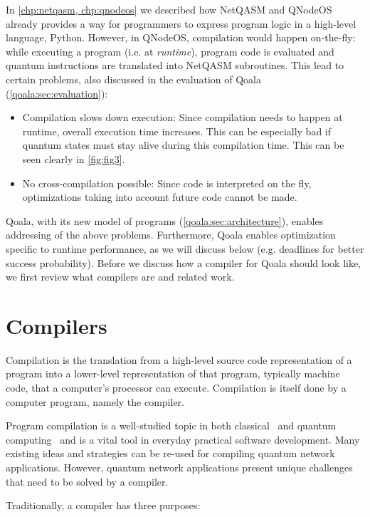 In \cref{chp:netqasm, chp:qnodeos} we described how NetQASM and QNodeOS already provides a way for programmers to express program logic in a high-level language, Python.
However, in \ac{QNodeOS}, compilation would happen on-the-fly:
while executing a program (i.e. at \emph{runtime}), program code is evaluated and quantum instructions are translated into NetQASM subroutines.
This lead to certain problems, also discussed in the evaluation of Qoala (\cref{qoala:sec:evaluation}):
\begin{itemize}
  \item Compilation slows down execution:
    Since compilation needs to happen at runtime, overall execution time increases.
    This can be especially bad if quantum states must stay alive during this compilation time.
    This can be seen clearly in \cref{fig:fig3}.
  \item No cross-compilation possible:
    Since code is interpreted on the fly, optimizations taking into account future code cannot be made. 
\end{itemize}

Qoala, with its new model of programs (\cref{qoala:sec:architecture}), enables addressing of the above problems.
Furthermore, Qoala enables optimization specific to runtime performance, as we will discuss below (e.g. deadlines for better success probability).
Before we discuss how a compiler for Qoala should look like, we first review what compilers are and related work.


\section{Compilers}
Compilation is the translation from a high-level source code representation of a program into a lower-level representation of that program, typically machine code, that a computer's processor can execute.
Compilation is itself done by a computer program, namely the compiler.

Program compilation is a well-studied topic in both classical~\cite{aho_compilers_2006} and quantum computing~\cite{chong_programming_2017} and is a vital tool in everyday practical software development.
Many existing ideas and strategies can be re-used for compiling quantum network applications.
However, quantum network applications present unique challenges that need to be solved by a compiler.

Traditionally, a compiler has three purposes:

